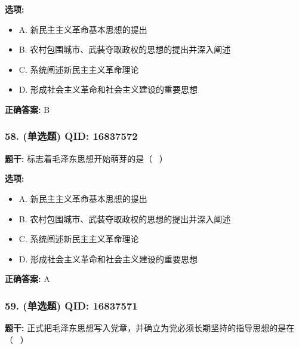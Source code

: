 \documentclass[12pt,UTF8]{ctexart}
\begin{document}
\textbf{选项:}
\begin{itemize}[leftmargin=*]

  \item A. 新民主主义革命基本思想的提出

  \item B. 农村包围城市、武装夺取政权的思想的提出并深入阐述

  \item C. 系统阐述新民主主义革命理论

  \item D. 形成社会主义革命和社会主义建设的重要思想

\end{itemize}

\textbf{正确答案:}
B

\vspace{0.3em}\hrulefill\vspace{0.7em}

\subsubsection*{58. (单选题) \small QID: 16837572}

\textbf{题干:}
标志着毛泽东思想开始萌芽的是（  ）

\textbf{选项:}
\begin{itemize}[leftmargin=*]

  \item A. 新民主主义革命基本思想的提出

  \item B. 农村包围城市、武装夺取政权的思想的提出并深入阐述

  \item C. 系统阐述新民主主义革命理论

  \item D. 形成社会主义革命和社会主义建设的重要思想

\end{itemize}

\textbf{正确答案:}
A

\vspace{0.3em}\hrulefill\vspace{0.7em}

\subsubsection*{59. (单选题) \small QID: 16837571}

\textbf{题干:}
正式把毛泽东思想写入党章，并确立为党必须长期坚持的指导思想的是在（  ）
\end{document}
